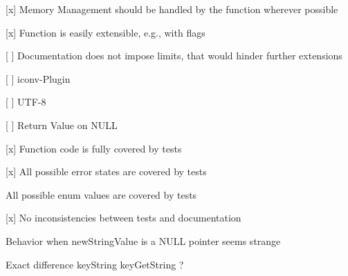 \begin{DoxyItemize}
\item \mbox{[}x\mbox{]} Memory Management should be handled by the function wherever possible
\end{DoxyItemize}


\begin{DoxyItemize}
\item \mbox{[}x\mbox{]} Function is easily extensible, e.\+g., with flags
\item \mbox{[} \mbox{]} Documentation does not impose limits, that would hinder further extensions
\begin{DoxyItemize}
\item \mbox{[} \mbox{]} iconv-\/\+Plugin
\item \mbox{[} \mbox{]} U\+T\+F-\/8
\item \mbox{[} \mbox{]} Return Value on N\+U\+LL
\end{DoxyItemize}
\end{DoxyItemize}


\begin{DoxyItemize}
\item \mbox{[}x\mbox{]} Function code is fully covered by tests
\item \mbox{[}x\mbox{]} All possible error states are covered by tests
\item All possible enum values are covered by tests
\item \mbox{[}x\mbox{]} No inconsistencies between tests and documentation
\end{DoxyItemize}

Behavior when {\ttfamily new\+String\+Value} is a N\+U\+LL pointer seems strange

Exact difference key\+String key\+Get\+String ? 